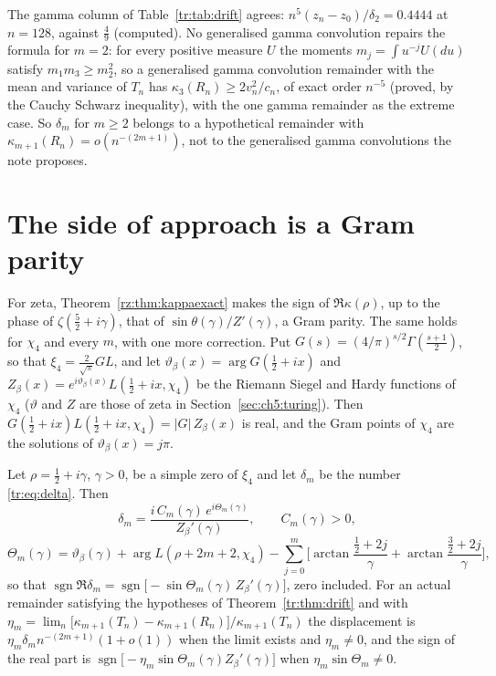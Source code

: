 The gamma column of Table~\ref{tr:tab:drift} agrees: $n^5(z_n-z_0)/\delta_2=0.4444$ at $n=128$, against $\frac49$ (computed). No generalised gamma convolution repairs the formula for $m=2$: for every positive measure $U$ the moments $m_j=\int u^{-j}U(du)$ satisfy $m_1m_3\ge m_2^2$, so a generalised gamma convolution remainder with the mean and variance of $T_n$ has $\kappa_3(R_n)\ge2v_n^2/c_n$, of exact order $n^{-5}$ (proved, by the Cauchy Schwarz inequality), with the one gamma remainder as the extreme case. So $\delta_m$ for $m\ge2$ belongs to a hypothetical remainder with $\kappa_{m+1}(R_n)=o(n^{-(2m+1)})$, not to the generalised gamma convolutions the note proposes.

\section{The side of approach is a Gram parity}\label{tr:sec:phase}

For zeta, Theorem~\ref{rz:thm:kappaexact} makes the sign of $\Re\kappa(\rho)$, up to the phase of $\zeta(\frac52+i\gamma)$, that of $\sin\theta(\gamma)/Z'(\gamma)$, a Gram parity. The same holds for $\chi_4$ and every $m$, with one more correction. Put $G(s)=(4/\pi)^{s/2}\Gamma(\frac{s+1}2)$, so that $\xi_4=\frac2{\sqrt\pi}GL$, and let $\vartheta_\beta(x)=\arg G(\tfrac12+ix)$ and $Z_\beta(x)=e^{i\vartheta_\beta(x)}L(\tfrac12+ix,\chi_4)$ be the Riemann Siegel and Hardy functions of $\chi_4$ ($\vartheta$ and $Z$ are those of zeta in Section~\ref{sec:ch5:turing}). Then $G(\frac12+ix)L(\frac12+ix,\chi_4)=|G|\,Z_\beta(x)$ is real, and the Gram points of $\chi_4$ are the solutions of $\vartheta_\beta(x)=j\pi$.

\begin{theorem}\label{tr:thm:phase}
Let $\rho=\frac12+i\gamma$, $\gamma>0$, be a simple zero of $\xi_4$ and let $\delta_m$ be the number \eqref{tr:eq:delta}. Then
\[
\delta_m=\frac{i\,C_m(\gamma)\,e^{i\Theta_m(\gamma)}}{Z_\beta'(\gamma)},\qquad C_m(\gamma)>0,
\]
\[
\Theta_m(\gamma)=\vartheta_\beta(\gamma)+\arg L(\rho+2m+2,\chi_4)-\sum_{j=0}^m\Big[\arctan\frac{\frac12+2j}\gamma+\arctan\frac{\frac32+2j}\gamma\Big],
\]
so that $\operatorname{sgn}\Re\delta_m=\operatorname{sgn}\big[-\sin\Theta_m(\gamma)\,Z_\beta'(\gamma)\big]$, zero included. For an actual remainder satisfying the hypotheses of Theorem~\ref{tr:thm:drift} and with $\eta_m=\lim_n\big[\kappa_{m+1}(T_n)-\kappa_{m+1}(R_n)\big]/\kappa_{m+1}(T_n)$ the displacement is $\eta_m\delta_mn^{-(2m+1)}(1+o(1))$ when the limit exists and $\eta_m\ne0$, and the sign of the real part is $\operatorname{sgn}\big[-\eta_m\sin\Theta_m(\gamma)Z_\beta'(\gamma)\big]$ when $\eta_m\sin\Theta_m\ne0$.
\end{theorem}

